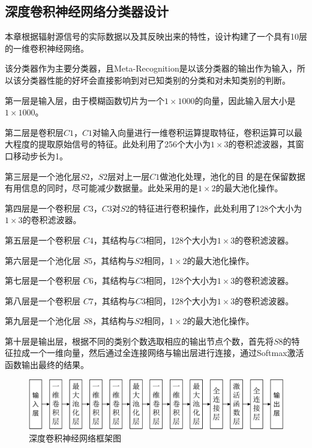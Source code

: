 \subsection{深度卷积神经网络分类器设计}
本章根据辐射源信号的实际数据以及其反映出来的特性，设计构建了一个具有10层的一维卷积神经网络。

该分类器作为主要分类器，且Meta-Recognition是以该分类器的输出作为输入，所以该分类器性能的好坏会直接影响到对已知类别的分类和对未知类别的判断。

第一层是输入层，由于模糊函数切片为一个$1 \times 1000$的向量，因此输入层大小是$1 \times 1000$。

第二层是卷积层$C1$，$C1$对输入向量进行一维卷积运算提取特征，卷积运算可以最
大程度的提取原始信号的特征。此处利用了256个大小为$1\times 3$的卷积滤波器，其窗口移动步长为1。

第三层是一个池化层$S2$，$S2$层对上一层$C1$做池化处理，池化的目
的是在保留数据有用信息的同时，尽可能减少数据量。此处采用的是$1\times 2$的最大池化操作。

第四层是一个卷积层 $C3$，$C3$对$S2$的特征进行卷积操作，此处利用了128个大小为$1\times 3$的卷积滤波器。

第五层是一个卷积层 $C4$，其结构与$C3$相同，128个大小为$1\times 3$的卷积滤波器。

第六层是一个池化层 $S5$，其结构与$S2$相同，$1\times 2$的最大池化操作。

第七层是一个卷积层 $C6$，其结构与$C3$相同，128个大小为$1\times 3$的卷积滤波器。

第八层是一个卷积层 $C7$，其结构与$C3$相同，128个大小为$1\times 3$的卷积滤波器。

第九层是一个池化层 $S8$，其结构与$S2$相同，$1\times 2$的最大池化操作。

第十层是输出层，根据不同的类别个数选取相应的输出节点个数，首先将$S8$的特征拉成一个一维向量，然后通过全连接网络与输出层进行连接，通过Softmax激活函数输出最终的结果。




\begin{figure}[htb]
	\centering
	\includegraphics[width=\textwidth]{figures/emitter/struct_emitter}
	\caption{深度卷积神经网络框架图}
\end{figure}


